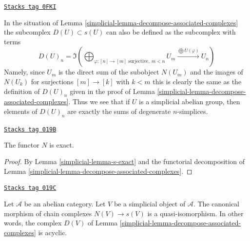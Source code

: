 \begin{remark}
\label{simplicial-remark-degenerate-subcomplex}
\href{https://stacks.math.columbia.edu/tag/0FKI}{\texttt{Stacks tag 0FKI}}

In the situation of Lemma \ref{simplicial-lemma-decompose-associated-complexes}
the subcomplex $D(U) \subset s(U)$ can also be defined as the
subcomplex with terms
$$
D(U)_n = \Im\left(
\bigoplus\nolimits_{\varphi : [n] \to [m]\text{ surjective}, \ m < n} U_m
\xrightarrow{\bigoplus U(\varphi)}
U_n\right)
$$
Namely, since $U_m$ is the direct sum of the subobject $N(U_m)$
and the images of $N(U_k)$ for surjections $[m] \to [k]$ with $k < m$
this is clearly the same as the definition of $D(U)_n$ given in
the proof of Lemma \ref{simplicial-lemma-decompose-associated-complexes}.
Thus we see that if $U$ is a simplicial abelian group, then
elements of $D(U)_n$ are exactly the sums of degenerate $n$-simplices.
\end{remark}

\begin{lemma}[N exact]
\label{simplicial-lemma-N-exact}
\href{https://stacks.math.columbia.edu/tag/019B}{\texttt{Stacks tag 019B}}

The functor $N$ is exact.
\end{lemma}

\begin{proof}

By Lemma \ref{simplicial-lemma-s-exact} and the functorial
decomposition of Lemma \ref{simplicial-lemma-decompose-associated-complexes}.
\end{proof}

\begin{lemma}
\label{simplicial-lemma-quasi-isomorphism}
\href{https://stacks.math.columbia.edu/tag/019C}{\texttt{Stacks tag 019C}}

Let $\mathcal{A}$ be an abelian category.
Let $V$ be a simplicial object of $\mathcal{A}$.
The canonical morphism of chain complexes
$N(V) \to s(V)$ is a quasi-isomorphism.
In other words, the complex $D(V)$ of Lemma
\ref{simplicial-lemma-decompose-associated-complexes} is acyclic.
\end{lemma}

